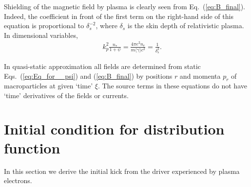 \documentclass[twocolumn,showpacs,aip]{revtex4}
\begin{document}
Shielding of the magnetic field by  plasma is clearly seen from  Eq.~(\ref{eq:B_final}).  Indeed, the coefficient in front of the first term on the  right-hand side of this equation is proportional to $\delta_s^{-2}$, where $\delta_s$ is the skin depth of relativistic plasma. In dimensional variables,  
\begin{eqnarray}
&&k_p^2\frac{n_{*}}{1+\psi}=\frac{4\pi e^2n_e}{m\langle\gamma\rangle c^2} =\frac{1}{\delta_s^{2}}.
\label{eq:SKIN}
\end{eqnarray}
   
In quasi-static approximation all fields  are determined from  static Eqs.~(\ref{eq:Eq_for__psi}) and (\ref{eq:B_final}) by positions $r$ and momenta $p_r$ of macroparticles at given `time' $\xi$.
The source terms in these equations 
 do not have `time' derivatives of the fields or currents.


\section{Initial condition for distribution function}
 In this section we derive  the initial kick from the driver experienced by  plasma electrons. 
\end{document}
